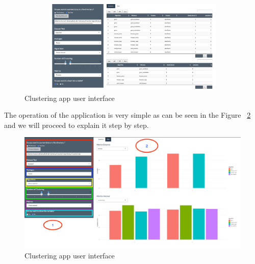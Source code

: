 \begin{figure}[htbp]
  \centering
   \includegraphics[width=14cm, height=4.5cm]{img/app}
    \caption{Clustering app user interface}
    \label{fig:layoutApp}%
\end{figure}

The operation of the application is very simple as can be seen in the Figure ~\ref{fig:layoutApp1} and we will proceed to explain it step by step.

\begin{figure}[htbp]
  \centering
   \includegraphics[width=14cm]{img/app1}
    \caption{Clustering app user interface}
    \label{fig:layoutApp1}%
\end{figure}

